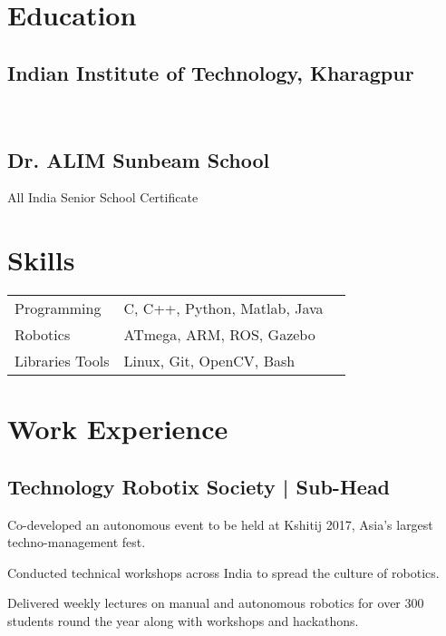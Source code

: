 \documentclass[]{cvclass}
\begin{document}
\separation
{}
\separation
\separation
\separation

\begin{minipage}[t]{0.45\textwidth} 

\section{Education}
\subsection{Indian Institute of Technology, Kharagpur}
 \\
\separation
\subsection{Dr. ALIM Sunbeam School}
All India Senior School Certificate \\
\separation

\section{Skills}
\begin{tabular}{lll}
Programming		& C, C++, Python, Matlab, Java& \\
Robotics		& ATmega, ARM, ROS, Gazebo& \\
Libraries  Tools	& Linux, Git, OpenCV, Bash& \\
\end{tabular}

\separation
\separation


\section{Work Experience}

\subsection{Technology Robotix Society | Sub-Head}
\separation
\separation
\begin{smallBullet}
\item  Co-developed an autonomous event to be held at Kshitij 2017, Asia’s largest techno-management
fest. 
\item Conducted technical workshops across India to spread the culture of robotics.
\item Delivered weekly lectures on manual and autonomous robotics for over 300 students round the year along with
workshops and hackathons.
\end{smallBullet}


\end{minipage}
\end{document}

